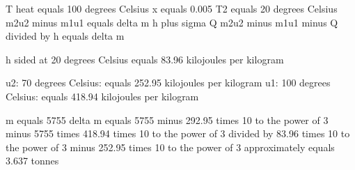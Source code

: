 T heat equals 100 degrees Celsius  
x equals 0.005  
T2 equals 20 degrees Celsius  
m2u2 minus m1u1 equals delta m h plus sigma Q  
m2u2 minus m1u1 minus Q divided by h equals delta m  

h sided at 20 degrees Celsius equals 83.96 kilojoules per kilogram  

u2: 70 degrees Celsius: equals 252.95 kilojoules per kilogram  
u1: 100 degrees Celsius: equals 418.94 kilojoules per kilogram  

m equals 5755  
delta m equals 5755 minus 292.95 times 10 to the power of 3 minus 5755 times 418.94 times 10 to the power of 3 divided by 83.96 times 10 to the power of 3 minus 252.95 times 10 to the power of 3 approximately equals 3.637 tonnes